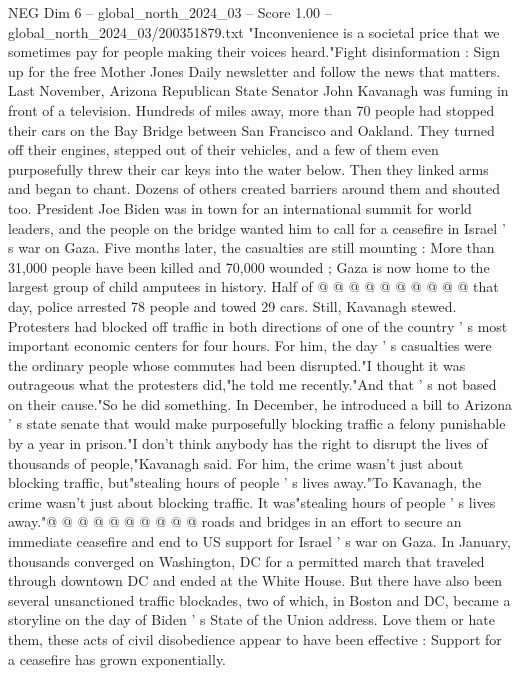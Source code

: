 \begin{textsample}{NEG Dim 6 – global\_north\_2024\_03 – Score 1.00 – global\_north\_2024\_03/200351879.txt}  \label{ex:f6_neg_402}
"Inconvenience is a societal price that we sometimes pay for people making their voices heard."Fight disinformation : Sign up for the free Mother Jones Daily newsletter and follow the news that matters.
Last November, Arizona Republican State Senator John Kavanagh was fuming in front of a television.
Hundreds of miles away, more than 70 people had stopped their cars on the Bay Bridge between San Francisco and Oakland.
They turned off their engines, stepped out of their vehicles, and a few of them even purposefully threw their car keys into the water below.
Then they linked arms and began to chant.
Dozens of others created barriers around them and shouted too.
President Joe Biden was in town for an international summit for world leaders, and the people on the bridge wanted him to call for a ceasefire in Israel ' s war on Gaza.
Five months later, the casualties are still mounting : More than 31,000 people have been killed and 70,000 wounded ; Gaza is now home to the largest group of child amputees in history.
Half of @ @ @ @ @ @ @ @ @ @ that day, police arrested 78 people and towed 29 cars.
Still, Kavanagh stewed.
Protesters had blocked off traffic in both directions of one of the country ' s most important economic centers for four hours.
For him, the day ' s casualties were the ordinary people whose commutes had been disrupted."I thought it was outrageous what the protesters did,"he told me recently."And that ' s not based on their cause."So he did something.
In December, he introduced a bill to Arizona ' s state senate that would make purposefully blocking traffic a felony punishable by a year in prison."I don't think anybody has the right to disrupt the lives of thousands of people,"Kavanagh said.
For him, the crime wasn't just about blocking traffic, but"stealing hours of people ' s lives away."To Kavanagh, the crime wasn't just about blocking traffic.
It was"stealing hours of people ' s lives away."@ @ @ @ @ @ @ @ @ @ roads and bridges in an effort to secure an immediate ceasefire and end to US support for Israel ' s war on Gaza.
In January, thousands converged on Washington, DC for a permitted march that traveled through downtown DC and ended at the White House.
But there have also been several unsanctioned traffic blockades, two of which, in Boston and DC, became a storyline on the day of Biden ' s State of the Union address.
Love them or hate them, these acts of civil disobedience appear to have been effective : Support for a ceasefire has grown exponentially.

\end{textsample}
